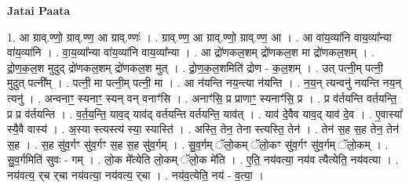 \documentclass[17pt]{extarticle}
\begin{document}
\textbf{Jatai Paata} \newline

1. आ ग्राव्.ण्णो॒ ग्राव्.ण्ण॒ आ ग्राव्.ण्णः॑ । . ग्राव्.ण्ण॒ आ ग्राव्.ण्णो॒ ग्राव्.ण्ण॒ आ । . आ वा॑य॒व्या॑नि वाय॒व्या᳚न्या वा॑य॒व्या॑नि । . वा॒य॒व्या᳚न्या वा॑य॒व्या॑नि वाय॒व्या᳚न्या । . आ द्रो॑णकल॒शम् द्रो॑णकल॒श मा द्रो॑णकल॒शम् । . द्रो॒ण॒क॒ल॒श मुदुद् द्रो॑णकल॒शम् द्रो॑णकल॒श मुत् । . द्रो॒ण॒क॒ल॒शमिति॑ द्रोण - क॒ल॒शम् । . उत् पत्नी॒म् पत्नी॒ मुदुत् पत्नी᳚म् । . पत्नी॒ मा पत्नी॒म् पत्नी॒ मा । . आ न॑यन्ति नय॒न्त्या न॑यन्ति । . न॒य॒न् त्यन्वनु॑ नयन्ति नय॒न् त्यनु॑ । . अन्वनाꣳ॒॒ स्यनाꣳ॒॒ स्यन् वन् वनाꣳ॑सि । . अनाꣳ॑सि॒ प्र प्राणाꣳ॒॒ स्यनाꣳ॑सि॒ प्र । . प्र व॑र्तयन्ति वर्तयन्ति॒ प्र प्र व॑र्तयन्ति । . व॒र्त॒य॒न्ति॒ याव॒द् याव॑द् वर्तयन्ति वर्तयन्ति॒ याव॑त् । . याव॑ दे॒वैव याव॒द् याव॑ दे॒व । . ए॒वास्या᳚ स्यै॒वै वास्य॑ । . अ॒स्या स्त्यस्त्य॑ स्या॒ स्यास्ति॑ । . अस्ति॒ तेन॒ तेना स्त्यस्ति॒ तेन॑ । . तेन॑ स॒ह स॒ह तेन॒ तेन॑ स॒ह । . स॒ह सु॑व॒र्गꣳ सु॑व॒र्गꣳ स॒ह स॒ह सु॑व॒र्गम् । . सु॒व॒र्गम् ॅलो॒कम् ॅलो॒कꣳ सु॑व॒र्गꣳ सु॑व॒र्गम् ॅलो॒कम् । . सु॒व॒र्गमिति॑ सुवः - गम् । . लो॒क मे᳚त्येति लो॒कम् ॅलो॒क मे॑ति । . ए॒ति॒ नय॑वत्या॒ नय॑व त्यैत्येति॒ नय॑वत्या । . नय॑वत्य॒ र्‌च र्‌चा नय॑वत्या॒ नय॑वत्य॒ र्‌चा । . नय॑व॒त्येति॒ नय॑ - व॒त्या॒ । \newline
\end{document}
